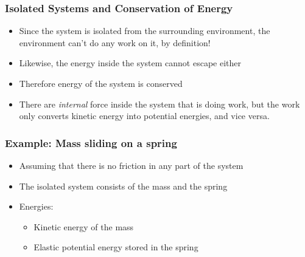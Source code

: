 \documentclass[12pt,compress,aspectratio=169]{beamer}
\begin{document}
\begin{frame}
  \frametitle{Isolated Systems and Conservation of Energy}
  \begin{itemize}
  \item Since the system is isolated from the surrounding environment, the
    environment can't do any work on it, by definition!
  \item Likewise, the energy inside the system cannot escape either
  \item Therefore energy of the system is conserved
  \item There are \emph{internal} force inside the system that is doing work,
    but the work only converts kinetic energy into potential energies, and vice
    versa.
  \end{itemize}
\end{frame}

\begin{frame}
  \frametitle{Example: Mass sliding on a spring}

  \begin{itemize}
  \item Assuming that there is no friction in any part of the system
  \item The isolated system consists of the mass and the spring 
  \item Energies:
    \begin{itemize}
    \item Kinetic energy of the mass
    \item Elastic potential energy stored in the spring
    \end{itemize}
  \end{itemize}
  \begin{center}
  \end{center}
\end{frame}
\end{document}
